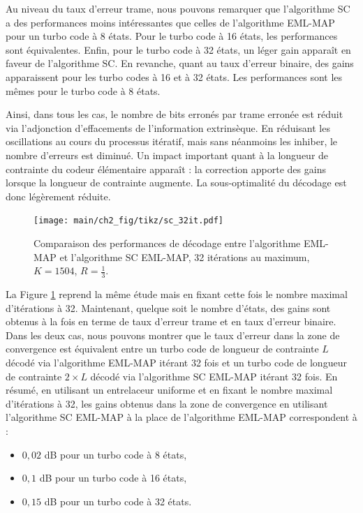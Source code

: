 Au niveau du taux d'erreur trame, nous pouvons remarquer que l'algorithme SC a des performances moins intéressantes que celles de
l'algorithme EML-MAP pour un turbo code à 8 états. Pour le turbo code à 16 états, les performances sont équivalentes. 
Enfin, pour le turbo code à 32 états, un léger gain apparaît en faveur de l'algorithme SC.
En revanche, quant au taux d'erreur binaire, des gains apparaissent pour les turbo codes à 16 et à 32 états. Les performances 
sont les mêmes pour le turbo code à 8 états.

Ainsi, dans tous les cas, le nombre de bits erronés par trame erronée est réduit via l'adjonction \og d'effacements \fg 
de l'information extrinsèque. En réduisant les oscillations au cours du processus itératif, mais sans néanmoins les inhiber,
le nombre d'erreurs est diminué. Un impact important quant à la longueur de contrainte du codeur élémentaire apparaît :
la correction apporte des gains lorsque la longueur de contrainte augmente. La sous-optimalité du décodage est donc légèrement réduite. 

\begin{figure}[!ht]
\vspace*{-.2cm}
	\centering
	\texttt{[image: main/ch2\_fig/tikz/sc\_32it.pdf]}
	\caption{Comparaison des performances de décodage entre l'algorithme EML-MAP et l'algorithme SC EML-MAP, 32 itérations au maximum, $K=1504$, $R=\frac{1}{3}$.\label{fig:sc32it}}
\vspace*{-2ex}
\end{figure}

La Figure \ref{fig:sc32it} reprend la même étude mais en fixant cette fois le nombre maximal d'itérations à 32. Maintenant,
quelque soit le nombre d'états, des gains sont obtenus à la fois en terme de taux d'erreur trame et en taux d'erreur binaire.\\
Dans les deux cas, nous pouvons montrer que le taux d'erreur dans la zone de convergence est équivalent entre un turbo code de  
longueur de contrainte $L$ décodé via l'algorithme EML-MAP itérant 32 fois et un turbo code de longueur de contrainte 
$2\times L$ décodé via l'algorithme SC EML-MAP itérant 32 fois. En résumé, en utilisant un entrelaceur uniforme et en 
fixant le nombre maximal d'itérations à 32, les gains obtenus dans la zone de convergence en utilisant l'algorithme SC 
EML-MAP à la place de l'algorithme EML-MAP correspondent à :
\begin{itemize}
	\item $0,02$ dB pour un turbo code à 8 états,
	\item $0,1$ dB pour un turbo code à 16 états,
	\item $0,15$ dB pour un turbo code à 32 états. \\
\end{itemize}

